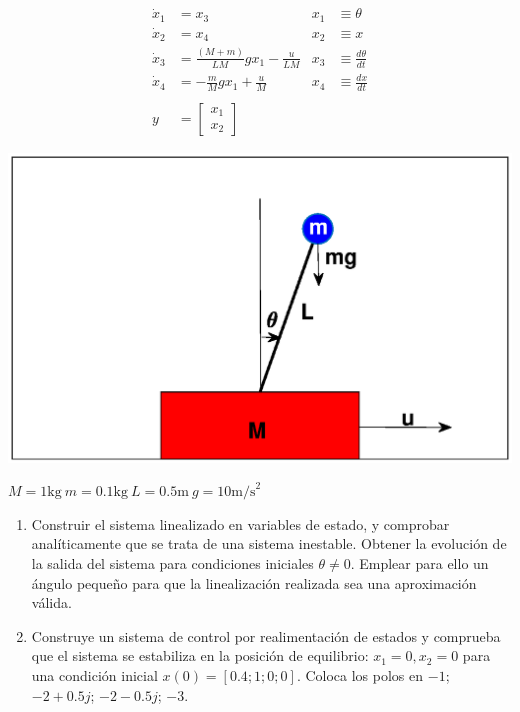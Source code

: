 \documentclass[10pt,a4paper]{article}
\begin{document}
\begin{enumerate}
\begin{minipage}{0.3\textwidth}
\begin{align*}
\dot{x}_1 &= x_3 &x_1 &\equiv \theta\\  
\dot{x}_2 &= x_4  &x_2 &\equiv x\\
\dot{x}_3 &= \frac{(M+m)}{LM}gx_1 - \frac{u}{LM} &x_3 &\equiv \frac{d\theta}{dt}\\
\dot{x}_4 &= -\frac{m}{M}gx_1 + \frac{u}{M} &x_4 &\equiv  \frac{dx}{dt}\\
\ \\
y &= \begin{bmatrix} x_1\\ x_2 \end{bmatrix} &
\end{align*}
\end{minipage}
\begin{minipage}{0.61\textwidth}
\includegraphics[width=\textwidth]{bloque.eps}

\hspace{12mm}  $ M =1\text{kg}\ m = 0.1\text{kg}\ L = 0.5\text{m}\  g = 10 \text{m/s}^2 $
\end{minipage}
\begin{enumerate}
\item \label{crtl} Construir el sistema linealizado en variables de estado, y comprobar analíticamente que se trata de una sistema inestable. Obtener la evolución de la salida del sistema para condiciones iniciales $\theta \neq 0$. Emplear para ello un ángulo pequeño para que la linealización realizada sea una aproximación válida.
\item Construye un sistema de control por realimentación de estados y comprueba que el sistema se estabiliza en la posición de equilibrio: $x_1 = 0, x_2 = 0$ para una condición inicial $x(0) =[0.4;1;0;0]$. Coloca los polos en $-1$; $ -2+0.5j$; $ -2-0.5j$; $-3$.


\end{enumerate}
\end{enumerate}
\end{document}
